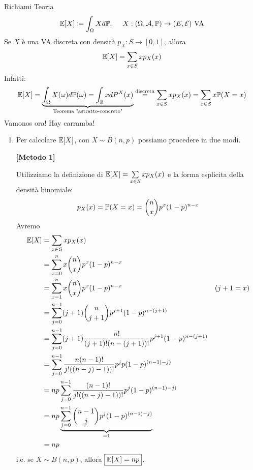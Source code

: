 Richiami Teoria
\begin{equation*}
\mathbb{E}[ X] \coloneqq \int _{\Omega } Xd\mathbb{P} ,\ \ \ \ X:( \Omega ,\mathcal{A} ,\mathbb{P})\rightarrow ( E,\mathcal{E}) \ \text{VA}
\end{equation*}
Se $X$ è una VA discreta con densità $p_{X} :S\rightarrow [ 0,1]$, allora
\begin{equation*}
\mathbb{E}[ X] =\sum\limits _{x\in S} xp_{X}( x)
\end{equation*}
Infatti:
\begin{equation*}
\mathbb{E}[ X] =\underbrace{\int _{\Omega } X( \omega ) d\mathbb{P}( \omega ) =\int _{\mathbb{R}} xdP^{X}( x)}_{\text{Teorema "astratto-concreto"}}\overset{\text{discreta}}{=}\sum\limits _{x\in S} xp_{X}( x) =\sum\limits _{x\in S} x\mathbb{P}( X=x)
\end{equation*}
Vamonos ora! Hay carramba!
\begin{enumerate}
\item Per calcolare $\mathbb{E}[ X]$, con $X\sim B( n,p)$ possiamo procedere in due modi.

\textbf{[Metodo 1]}

Utilizziamo la definizione di $\mathbb{E}[ X] =\sum\limits _{x\in S} xp_{X}( x)$ e la forma esplicita della densità binomiale:
\begin{equation*}
p_{X}( x) =\mathbb{P}( X=x) =\binom{n}{x} p^{x}( 1-p)^{n-x}
\end{equation*}
Avremo
\begin{align*}
\mathbb{E}[ X] & =\sum\limits _{x\in S} xp_{X}( x) & \\
 & =\sum\limits _{x=0}^{n} x\binom{n}{x} p^{x}( 1-p)^{n-x} & \\
 & =\sum\limits _{x=1}^{n} x\binom{n}{x} p^{x}( 1-p)^{n-x} & ( j+1=x)\\
 & =\sum\limits _{j=0}^{n-1}( j+1)\binom{n}{j+1} p^{j+1}( 1-p)^{n-( j+1)} & \\
 & =\sum\limits _{j=0}^{n-1}( j+1)\frac{n!}{( j+1) !( n-( j+1)) !} p^{j+1}( 1-p)^{n-( j+1)} & \\
 & =\sum\limits _{j=0}^{n-1}\frac{n( n-1) !}{j!(( n-j) -1)) !} p^{j} p( 1-p)^{( n-1) -j)} & \\
 & =np\sum\limits _{j=0}^{n-1}\frac{( n-1) !}{j!(( n-j) -1)) !} p^{j}( 1-p)^{( n-1) -j)} & \\
 & =np\underbrace{\sum\limits _{j=0}^{n-1}\binom{n-1}{j} p^{j}( 1-p)^{( n-1) -j)}}_{=1} & \\
 & =np & 
\end{align*}
i.e. se $X\sim B( n,p)$, allora $\boxed{\mathbb{E}[ X] =np}$.


\end{enumerate}
